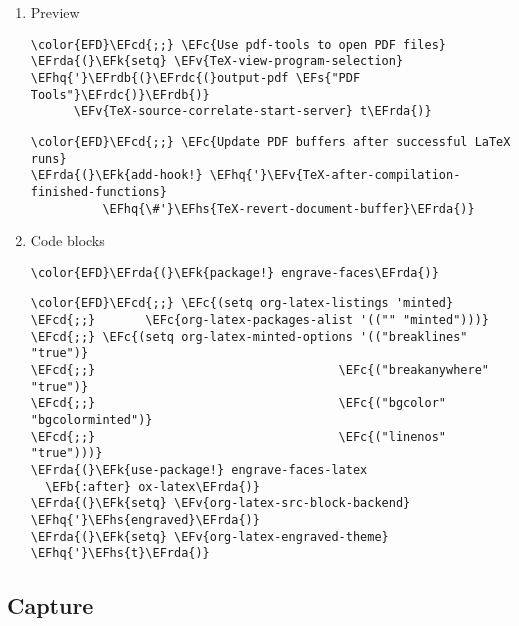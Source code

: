 \documentclass[c]{article}
\theoremstyle{plain}%
\theoremstyle{definition}
\theoremstyle{remark}
\newcommand{\EFc}[1]{\textcolor{EFc}{#1}} %
\newcommand{\EFcd}[1]{\textcolor{EFcd}{#1}} %
\newcommand{\EFs}[1]{\textcolor{EFs}{#1}} %
\newcommand{\EFk}[1]{\textcolor{EFk}{#1}} %
\newcommand{\EFb}[1]{\textcolor{EFb}{#1}} %
\newcommand{\EFv}[1]{\textcolor{EFv}{#1}} %
\newcommand{\EFhq}[1]{\textcolor{EFhq}{#1}} %
\newcommand{\EFhs}[1]{\textcolor{EFhs}{#1}} %
\newcommand{\EFrda}[1]{\textcolor{EFrda}{#1}} %
\newcommand{\EFrdb}[1]{\textcolor{EFrdb}{#1}} %
\newcommand{\EFrdc}[1]{\textcolor{EFrdc}{#1}} %
\begin{document}
\begin{enumerate}
\item Preview
\label{sec:orgb99d1ad}
\begin{Code}
\begin{Verbatim}
\color{EFD}\EFcd{;;} \EFc{Use pdf-tools to open PDF files}
\EFrda{(}\EFk{setq} \EFv{TeX-view-program-selection} \EFhq{'}\EFrdb{(}\EFrdc{(}output-pdf \EFs{"PDF Tools"}\EFrdc{)}\EFrdb{)}
      \EFv{TeX-source-correlate-start-server} t\EFrda{)}
\end{Verbatim}
\end{Code}
\begin{Code}
\begin{Verbatim}
\color{EFD}\EFcd{;;} \EFc{Update PDF buffers after successful LaTeX runs}
\EFrda{(}\EFk{add-hook!} \EFhq{'}\EFv{TeX-after-compilation-finished-functions}
          \EFhq{\#'}\EFhs{TeX-revert-document-buffer}\EFrda{)}
\end{Verbatim}
\end{Code}
\item Code blocks
\label{sec:orgef7453a}
\begin{Code}
\begin{Verbatim}
\color{EFD}\EFrda{(}\EFk{package!} engrave-faces\EFrda{)}
\end{Verbatim}
\end{Code}
\begin{Code}
\begin{Verbatim}
\color{EFD}\EFcd{;;} \EFc{(setq org-latex-listings 'minted}
\EFcd{;;}       \EFc{org-latex-packages-alist '(("" "minted")))}
\EFcd{;;} \EFc{(setq org-latex-minted-options '(("breaklines" "true")}
\EFcd{;;}                                  \EFc{("breakanywhere" "true")}
\EFcd{;;}                                  \EFc{("bgcolor" "bgcolorminted")}
\EFcd{;;}                                  \EFc{("linenos" "true")))}
\EFrda{(}\EFk{use-package!} engrave-faces-latex
  \EFb{:after} ox-latex\EFrda{)}
\EFrda{(}\EFk{setq} \EFv{org-latex-src-block-backend} \EFhq{'}\EFhs{engraved}\EFrda{)}
\EFrda{(}\EFk{setq} \EFv{org-latex-engraved-theme} \EFhq{'}\EFhs{t}\EFrda{)}
\end{Verbatim}
\end{Code}
\end{enumerate}
\subsection{Capture}
\label{sec:org5108f4a}
\end{document}
